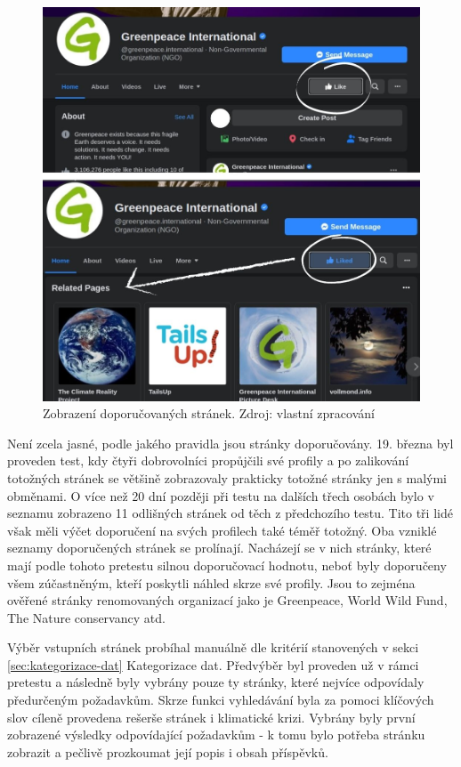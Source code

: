     \begin{figure}[H]
        \includegraphics[width=\linewidth]{obrazky/like_doporucena (1).jpg}
        \centering
        \caption[Zobrazení doporučovaných stránek]{Zobrazení doporučovaných stránek. Zdroj: vlastní zpracování}
        \label{fig:fb-likedoporucenestranky}
    \end{figure}
  
    Není zcela jasné, podle jakého pravidla jsou stránky doporučovány. 19. března byl proveden test, kdy čtyři dobrovolníci propůjčili své profily a po zalikování totožných stránek se většině zobrazovaly prakticky totožné stránky jen s malými obměnami. O více než 20 dní později při testu na dalších třech osobách bylo v seznamu zobrazeno 11 odlišných stránek od těch z předchozího testu. Tito tři lidé však měli výčet doporučení na svých profilech také téměř totožný. Oba vzniklé seznamy doporučených stránek se prolínají. Nacházejí se v nich stránky, které mají podle tohoto pretestu silnou doporučovací hodnotu, neboť byly doporučeny všem zúčastněným, kteří poskytli náhled skrze své profily. Jsou to zejména ověřené stránky renomovaných organizací jako je Greenpeace, World Wild Fund, The Nature conservancy atd.  
    
    Výběr vstupních stránek probíhal manuálně dle kritérií stanovených v sekci \ref{sec:kategorizace-dat} Kategorizace dat. Předvýběr byl proveden už v rámci pretestu a následně byly vybrány pouze ty stránky, které nejvíce odpovídaly předurčeným požadavkům. Skrze funkci vyhledávání byla za pomoci klíčových slov cíleně provedena rešerše stránek  i  klimatické krizi. Vybrány byly první zobrazené výsledky odpovídající požadavkům - k tomu bylo potřeba stránku zobrazit a pečlivě prozkoumat její popis i obsah příspěvků. 
    
